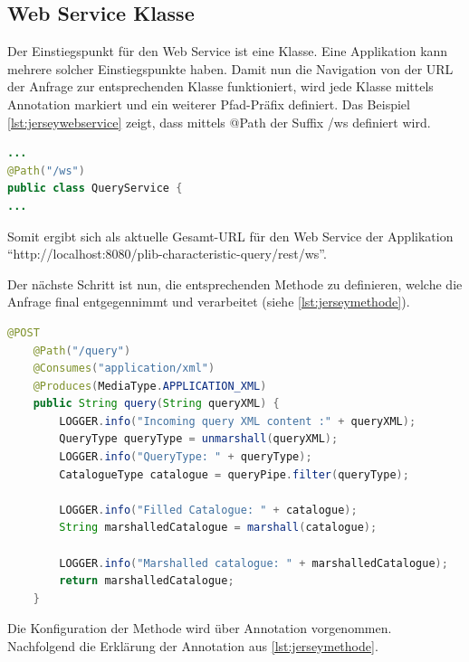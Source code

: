 \subsection{Web Service Klasse}
Der Einstiegspunkt für den \gls{Web Service} ist eine Klasse. Eine Applikation kann mehrere solcher Einstiegspunkte haben. Damit nun die Navigation von der URL der Anfrage zur entsprechenden Klasse funktioniert, wird jede Klasse mittels Annotation markiert und ein weiterer Pfad-Präfix definiert. Das Beispiel 
\autoref{lst:jerseywebservice} zeigt, dass mittels @Path der Suffix /ws definiert wird. 
  \begin{lstlisting}[caption=Jersey Web Service Klasse, language=Java, label=lst:jerseywebservice]
...
@Path("/ws")
public class QueryService {
...
 \end{lstlisting}  
 
Somit ergibt sich als aktuelle Gesamt-URL für den Web Service der Applikation \\  \enquote{http://localhost:8080/plib-characteristic-query/rest/ws}.
 
Der nächste Schritt ist nun, die entsprechenden Methode zu definieren, welche die Anfrage final entgegennimmt und verarbeitet (siehe \autoref{lst:jerseymethode}). 
 
  \begin{lstlisting}[caption=Jersey Methode, language=Java, label=lst:jerseymethode]
    @POST
    @Path("/query")
    @Consumes("application/xml")
    @Produces(MediaType.APPLICATION_XML)
    public String query(String queryXML) {
        LOGGER.info("Incoming query XML content :" + queryXML);
        QueryType queryType = unmarshall(queryXML);
        LOGGER.info("QueryType: " + queryType);
        CatalogueType catalogue = queryPipe.filter(queryType);

        LOGGER.info("Filled Catalogue: " + catalogue);
        String marshalledCatalogue = marshall(catalogue);

        LOGGER.info("Marshalled catalogue: " + marshalledCatalogue);
        return marshalledCatalogue;
    }
 \end{lstlisting}  

Die Konfiguration der Methode wird über \Gls{Annotation} vorgenommen. Nachfolgend die Erklärung der \Gls{Annotation} aus \autoref{lst:jerseymethode}.

